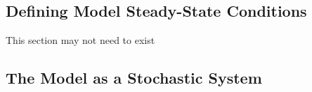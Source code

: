 \documentclass[12pt, a4paper]{article}
\begin{document}
\subsection{Defining Model Steady-State Conditions}
This section may not need to exist


\clearpage
\subsection{The Model as a Stochastic System}


{}

\end{document}
